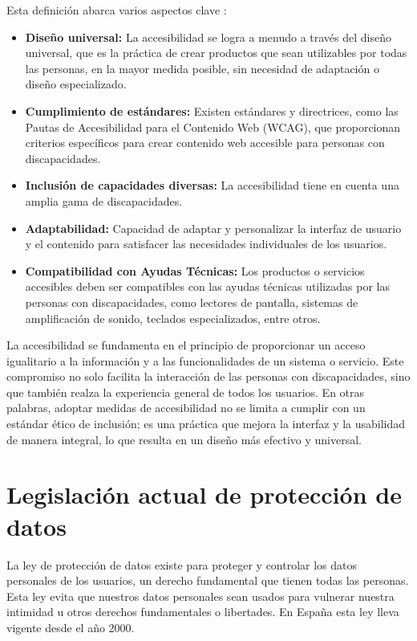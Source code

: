 Esta definición abarca varios aspectos clave \cite{principios_accesibilidad}: 

\begin{itemize}
	\item \textbf{Diseño universal: } La accesibilidad se logra a menudo a través del diseño universal, que es la práctica de crear productos que sean utilizables por todas las personas, en la mayor medida posible, sin necesidad de adaptación o diseño especializado.
	\item \textbf{Cumplimiento de estándares: } Existen estándares y directrices, como las Pautas de Accesibilidad para el Contenido Web (WCAG), que proporcionan criterios específicos para crear contenido web accesible para personas con discapacidades.
	\item \textbf{Inclusión de capacidades diversas: } La accesibilidad tiene en cuenta una amplia gama de discapacidades.
	\item \textbf{Adaptabilidad: } Capacidad de adaptar y personalizar la interfaz de usuario y el contenido para satisfacer las necesidades individuales de los usuarios.
	\item \textbf{Compatibilidad con Ayudas Técnicas: } Los productos o servicios accesibles deben ser compatibles con las ayudas técnicas utilizadas por las personas con discapacidades, como lectores de pantalla, sistemas de amplificación de sonido, teclados especializados, entre otros.
\end{itemize}

La accesibilidad se fundamenta en el principio de proporcionar un acceso igualitario a la información y a las funcionalidades de un sistema o servicio. Este compromiso no solo facilita la interacción de las personas con discapacidades, sino que también realza la experiencia general de todos los usuarios. En otras palabras, adoptar medidas de accesibilidad no se limita a cumplir con un estándar ético de inclusión; es una práctica que mejora la interfaz y la usabilidad de manera integral, lo que resulta en un diseño más efectivo y universal. \cite{fernandez2021accesibilidad}

\newpage

\section{Legislación actual de protección de datos}

La ley de protección de datos existe para proteger y controlar los datos personales de los usuarios, un derecho fundamental que tienen todas las personas. Esta ley evita que nuestros datos personales sean usados para vulnerar nuestra intimidad u otros derechos fundamentales o libertades. En España esta ley lleva vigente desde el año 2000. \cite{proteccionDatos}\\

